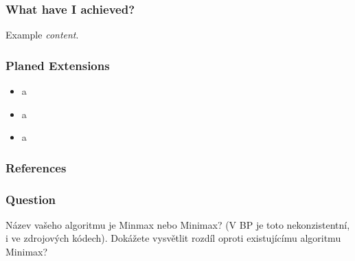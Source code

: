 \documentclass[10pt,xcolor=pdflatex]{beamer}
\begin{document}
\begin{frame}\frametitle{What have I achieved?}
    Example \emph{content}.
\end{frame}

\begin{frame}\frametitle{Planed Extensions}
  \begin{itemize}
    \item a
    \item a
    \item a
  \end{itemize}
\end{frame}

\begin{frame}[allowframebreaks]
	\frametitle{References}
	\printbibliography
\end{frame}

\appendix

\begin{frame}\frametitle{Question}
    Název vašeho algoritmu je Minmax nebo Minimax? (V BP je toto nekonzistentní, i ve zdrojových kódech). Dokážete vysvětlit rozdíl oproti existujícímu algoritmu Minimax?
\end{frame}

\end{document}
